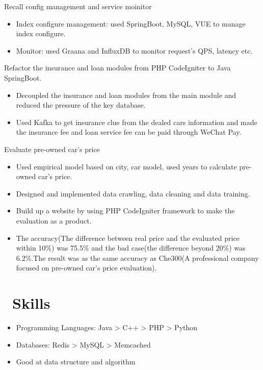 \documentclass{resume}
\begin{document}
Recall config management and service moinitor
\begin{itemize}
  \item Index configure management: used SpringBoot, MySQL, VUE to manage index configure.
  \item Monitor: used Graana and InfluxDB to monitor request's QPS, latency etc.
\end{itemize}

Refactor the insurance and loan modules from PHP CodeIgniter to Java SpringBoot.
\begin{itemize}
  \item Decoupled the insurance and loan modules from the main module and reduced the pressure of the key database.
  \item Used Kafka to get insurance clue from the dealed cars information and made the insurance fee and loan service fee can be paid through WeChat Pay.
\end{itemize}

Evaluate pre-owned car's price
\begin{itemize}
  \item Used empirical model based on city, car model, used years to calculate pre-owned car's price.
  \item Designed and implemented data crawling, data cleaning and data training.
  \item Build up a website by using PHP CodeIgniter framework to make the evaluation as a product.
  \item The accuracy(The difference between real price and the evaluated price within 10\%) was 75.5\% and the bad case(the difference beyond 20\%) was 6.2\%.The result was as the same accuracy as Che300(A professional company focused on pre-owned car's price evaluation).
\end{itemize}

\section{\faCogs\ Skills}
\begin{itemize}[parsep=0.5ex]
  \item Programming Languages: Java > C++ > PHP > Python
  \item Databases: Redis > MySQL > Memcached
  \item Good at data structure and algorithm
\end{itemize}
\end{document}
